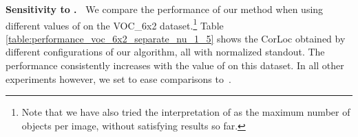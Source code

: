 \documentclass[10pt,twocolumn,letterpaper]{article}
\numberwithin{theorem}{section}
\newcommand{\parag}[1]{\vspace{4pt}\noindent\textbf{#1~}}
\begin{document}
\parag{Sensitivity to .} 
We compare the performance of our method when using different values of  on the VOC\_6x2 dataset.\footnote{Note that we have also tried the interpretation of  as the maximum number of objects per image, without satisfying results so far.} Table \ref{table:performance_voc_6x2_separate_nu_1_5} shows the CorLoc obtained by different configurations of our algorithm, all with normalized standout. The performance consistently increases with the value of  on this dataset. In all other experiments however, we set  to ease comparisons to~\cite{CKSP15}.
\begin{table}
\centering
{}
\vspace{-2mm}
\caption{\small Performance of different configurations of our algorithm with ,  and .}
\label{table:performance_voc_6x2_separate_nu_1_5}
\vspace{-4mm}
\end{table}
\end{document}
